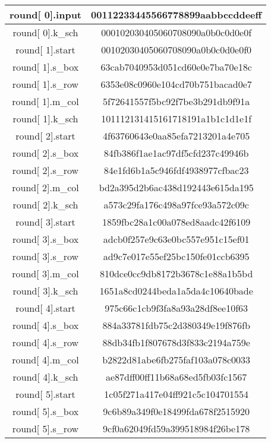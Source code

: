 \begin{center}
\begin{longtable}{|c|c|}
\hline
round[ 0].input&    00112233445566778899aabbccddeeff\\
\hline
round[ 0].k\_sch&   000102030405060708090a0b0c0d0e0f\\
\hline
round[ 1].start&    00102030405060708090a0b0c0d0e0f0\\
\hline
round[ 1].s\_box&   63cab7040953d051cd60e0e7ba70e18c\\
\hline
round[ 1].s\_row&   6353e08c0960e104cd70b751bacad0e7\\
\hline
round[ 1].m\_col&   5f72641557f5bc92f7be3b291db9f91a\\
\hline
round[ 1].k\_sch&   101112131415161718191a1b1c1d1e1f\\
\hline
round[ 2].start&    4f63760643e0aa85efa7213201a4e705\\
\hline
round[ 2].s\_box&   84fb386f1ae1ac97df5cfd237c49946b\\
\hline
round[ 2].s\_row&   84e1fd6b1a5c946fdf4938977cfbac23\\
\hline
round[ 2].m\_col&   bd2a395d2b6ac438d192443e615da195\\
\hline
round[ 2].k\_sch&   a573c29fa176c498a97fce93a572c09c\\
\hline
round[ 3].start&    1859fbc28a1c00a078ed8aadc42f6109\\
\hline
round[ 3].s\_box&   adcb0f257e9c63e0bc557e951c15ef01\\
\hline
round[ 3].s\_row&   ad9c7e017e55ef25bc150fe01ccb6395\\
\hline
round[ 3].m\_col&   810dce0cc9db8172b3678c1e88a1b5bd\\
\hline
round[ 3].k\_sch&   1651a8cd0244beda1a5da4c10640bade\\
\hline
round[ 4].start&    975c66c1cb9f3fa8a93a28df8ee10f63\\
\hline
round[ 4].s\_box&   884a33781fdb75c2d380349e19f876fb\\
\hline
round[ 4].s\_row&   88db34fb1f807678d3f833c2194a759e\\
\hline
round[ 4].m\_col&   b2822d81abe6fb275faf103a078c0033\\
\hline
round[ 4].k\_sch&   ae87dff00ff11b68a68ed5fb03fc1567\\
\hline
round[ 5].start&    1c05f271a417e04ff921c5c104701554\\
\hline
round[ 5].s\_box&   9c6b89a349f0e18499fda678f2515920\\
\hline
round[ 5].s\_row&   9cf0a62049fd59a399518984f26be178\\

\end{longtable}
\end{center}
